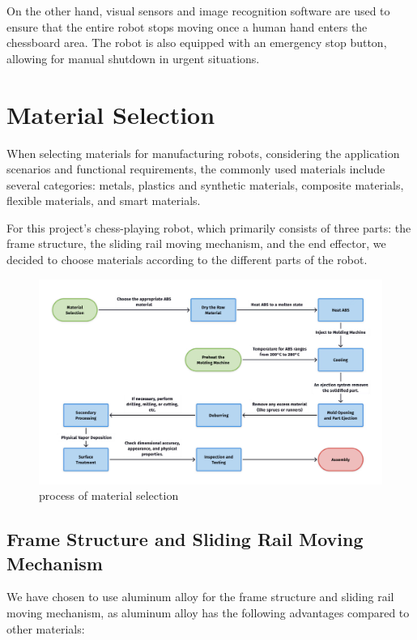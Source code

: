 \documentclass[10pt, a4paper, twocolumn]{article}
\begin{document}
On the other hand, visual sensors and image recognition software are used to ensure that the entire robot stops moving once a human hand enters the chessboard area. The robot is also equipped with an emergency stop button, allowing for manual shutdown in urgent situations.

\section{Material Selection}
When selecting materials for manufacturing robots, considering the application scenarios and functional requirements, the commonly used materials include several categories: metals, plastics and synthetic materials, composite materials, flexible materials, and smart materials.

For this project's chess-playing robot, which primarily consists of three parts: the frame structure, the sliding rail moving mechanism, and the end effector, we decided to choose materials according to the different parts of the robot.

\begin{figure}
    \centering
    \includegraphics[width=\linewidth]{material selection.jpg}
    \caption{process of material selection}
    \label{fig:process of material selection}
\end{figure}

\subsection{Frame Structure and Sliding Rail Moving Mechanism}
We have chosen to use aluminum alloy for the frame structure and sliding rail moving mechanism, as aluminum alloy has the following advantages compared to other materials:
\end{document}
